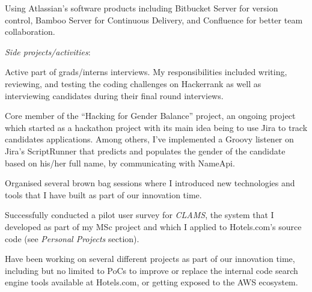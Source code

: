 \begin{cventries}
{\begin{cvitems}
        \item {Using Atlassian's software products including Bitbucket Server for version control, Bamboo Server for Continuous Delivery, and Confluence for better team collaboration.}
       \end{cvitems}
       \vspace{15pt}
       \textit{Side projects/activities}:
       \vspace{12pt}
       \begin{cvitems}
        \item {Active part of grads/interns interviews. My responsibilities included writing, reviewing, and testing the coding challenges on Hackerrank as well as interviewing candidates during their final round interviews.}
         \item {Core member of the ``Hacking for Gender Balance'' project, an ongoing project which started as a hackathon project with its main idea being to use Jira to track candidates applications. Among others, I've implemented a Groovy listener on Jira's ScriptRunner that predicts and populates the gender of the candidate based on his/her full name, by communicating with NameApi.}
        \item{Organised several brown bag sessions where I introduced new technologies and tools that I have built as part of our innovation time.}
        \item{Successfully conducted a pilot user survey for \textit{CLAMS}, the system that I developed as part of my MSc project and which I applied to Hotels.com's source code (see \textit{Personal Projects} section).}
         \item{Have been working on several different projects as part of our innovation time, including but no limited to PoCs to improve or replace the internal code search engine tools available at Hotels.com, or getting exposed to the AWS ecosystem.}
      \end{cvitems}
    }
\vspace{100pt}
\end{cventries}